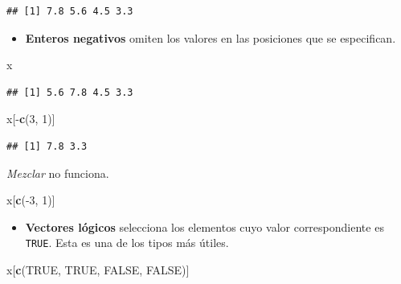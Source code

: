 \documentclass[]{article}
\newenvironment{Shaded}{\begin{snugshade}}{\end{snugshade}}
\newcommand{\KeywordTok}[1]{\textcolor[rgb]{0.13,0.29,0.53}{\textbf{{#1}}}}
\newcommand{\DecValTok}[1]{\textcolor[rgb]{0.00,0.00,0.81}{{#1}}}
\newcommand{\OtherTok}[1]{\textcolor[rgb]{0.56,0.35,0.01}{{#1}}}
\newcommand{\NormalTok}[1]{{#1}}
\begin{document}
\begin{verbatim}
## [1] 7.8 5.6 4.5 3.3
\end{verbatim}

\begin{itemize}
\itemsep1pt\parskip0pt
\item
  \textbf{Enteros negativos} omiten los valores en las posiciones que se
  especifican.
\end{itemize}

\begin{Shaded}
\begin{Highlighting}[]
\NormalTok{x}
\end{Highlighting}
\end{Shaded}

\begin{verbatim}
## [1] 5.6 7.8 4.5 3.3
\end{verbatim}

\begin{Shaded}
\begin{Highlighting}[]
\NormalTok{x[-}\KeywordTok{c}\NormalTok{(}\DecValTok{3}\NormalTok{, }\DecValTok{1}\NormalTok{)]}
\end{Highlighting}
\end{Shaded}

\begin{verbatim}
## [1] 7.8 3.3
\end{verbatim}

\emph{Mezclar} no funciona.

\begin{Shaded}
\begin{Highlighting}[]
\NormalTok{x[}\KeywordTok{c}\NormalTok{(-}\DecValTok{3}\NormalTok{, }\DecValTok{1}\NormalTok{)]}
\end{Highlighting}
\end{Shaded}

\begin{itemize}
\itemsep1pt\parskip0pt
\item
  \textbf{Vectores lógicos} selecciona los elementos cuyo valor
  correspondiente es \texttt{TRUE}. Esta es una de los tipos más útiles.
\end{itemize}

\begin{Shaded}
\begin{Highlighting}[]
\NormalTok{x[}\KeywordTok{c}\NormalTok{(}\OtherTok{TRUE}\NormalTok{, }\OtherTok{TRUE}\NormalTok{, }\OtherTok{FALSE}\NormalTok{, }\OtherTok{FALSE}\NormalTok{)]}
\end{Highlighting}
\end{Shaded}
\end{document}
